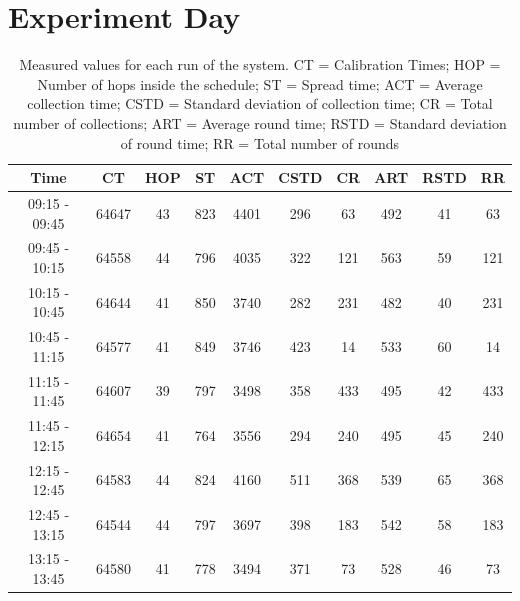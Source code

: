 \section{Experiment Day}
\begin{table}[htbp]
 \caption{Measured values for each run of the system. CT = Calibration Times; HOP = Number of hops inside the schedule; ST = Spread time; ACT = Average collection time; CSTD = Standard deviation of collection time; CR = Total number of collections; ART = Average round time; RSTD = Standard deviation of round time; RR = Total number of rounds}
 \centering
 \begin{tabular}{c||c|c|c|c|c|c|c|c|c}
  Time & CT & HOP & ST & ACT & CSTD & CR & ART & RSTD & RR\\ \toprule
  09:15 - 09:45 & 64647 & 43 & 823 & 4401 & 296 & 63 & 492 & 41 & 63\\ 
  09:45 - 10:15 & 64558 & 44 & 796 & 4035 & 322 & 121 & 563 & 59 & 121\\
  10:15 - 10:45 & 64644 & 41 & 850 & 3740 & 282 & 231 & 482 & 40 & 231\\
  10:45 - 11:15 & 64577 & 41 & 849 & 3746 & 423 & 14 & 533 & 60 & 14\\ 
  11:15 - 11:45 & 64607 & 39 & 797 & 3498 & 358 & 433 & 495 & 42 & 433\\
  11:45 - 12:15 & 64654 & 41 & 764 & 3556 & 294 & 240 & 495 & 45 & 240\\
  12:15 - 12:45 & 64583 & 44 & 824 & 4160 & 511 & 368 & 539 & 65 & 368\\
  12:45 - 13:15 & 64544 & 44 & 797 & 3697 & 398 & 183 & 542 & 58 & 183\\
  13:15 - 13:45 & 64580 & 41 & 778 & 3494 & 371 & 73 & 528 & 46 & 73\\
 \end{tabular}
 \label{tab:NightTable}
\end{table}

